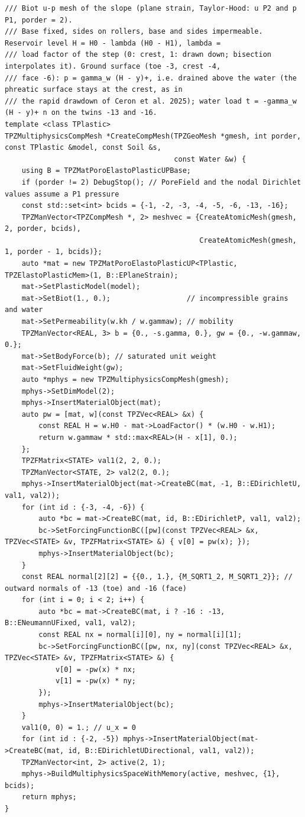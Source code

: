 \documentclass[11pt,a4paper]{article}
\newcommand{\cc}[1]{\texttt{\detokenize{#1}}} %
\begin{document}
\begin{lstlisting}[caption={Elementos gêmeos, malhas atômicas e malha multifísica u--p (\cc{Projects/SlopeDrawdown/main.cpp}).},label=lst:up]
/// Biot u-p mesh of the slope (plane strain, Taylor-Hood: u P2 and p P1, porder = 2).
/// Base fixed, sides on rollers, base and sides impermeable. Reservoir level H = H0 - lambda (H0 - H1), lambda =
/// load factor of the step (0: crest, 1: drawn down; bisection interpolates it). Ground surface (toe -3, crest -4,
/// face -6): p = gamma_w (H - y)+, i.e. drained above the water (the phreatic surface stays at the crest, as in
/// the rapid drawdown of Ceron et al. 2025); water load t = -gamma_w (H - y)+ n on the twins -13 and -16.
template <class TPlastic>
TPZMultiphysicsCompMesh *CreateCompMesh(TPZGeoMesh *gmesh, int porder, const TPlastic &model, const Soil &s,
                                        const Water &w) {
    using B = TPZMatPoroElastoPlasticUPBase;
    if (porder != 2) DebugStop(); // PoreField and the nodal Dirichlet values assume a P1 pressure
    const std::set<int> bcids = {-1, -2, -3, -4, -5, -6, -13, -16};
    TPZManVector<TPZCompMesh *, 2> meshvec = {CreateAtomicMesh(gmesh, 2, porder, bcids),
                                              CreateAtomicMesh(gmesh, 1, porder - 1, bcids)};
    auto *mat = new TPZMatPoroElastoPlasticUP<TPlastic, TPZElastoPlasticMem>(1, B::EPlaneStrain);
    mat->SetPlasticModel(model);
    mat->SetBiot(1., 0.);                  // incompressible grains and water
    mat->SetPermeability(w.kh / w.gammaw); // mobility
    TPZManVector<REAL, 3> b = {0., -s.gamma, 0.}, gw = {0., -w.gammaw, 0.};
    mat->SetBodyForce(b); // saturated unit weight
    mat->SetFluidWeight(gw);
    auto *mphys = new TPZMultiphysicsCompMesh(gmesh);
    mphys->SetDimModel(2);
    mphys->InsertMaterialObject(mat);
    auto pw = [mat, w](const TPZVec<REAL> &x) {
        const REAL H = w.H0 - mat->LoadFactor() * (w.H0 - w.H1);
        return w.gammaw * std::max<REAL>(H - x[1], 0.);
    };
    TPZFMatrix<STATE> val1(2, 2, 0.);
    TPZManVector<STATE, 2> val2(2, 0.);
    mphys->InsertMaterialObject(mat->CreateBC(mat, -1, B::EDirichletU, val1, val2));
    for (int id : {-3, -4, -6}) {
        auto *bc = mat->CreateBC(mat, id, B::EDirichletP, val1, val2);
        bc->SetForcingFunctionBC([pw](const TPZVec<REAL> &x, TPZVec<STATE> &v, TPZFMatrix<STATE> &) { v[0] = pw(x); });
        mphys->InsertMaterialObject(bc);
    }
    const REAL normal[2][2] = {{0., 1.}, {M_SQRT1_2, M_SQRT1_2}}; // outward normals of -13 (toe) and -16 (face)
    for (int i = 0; i < 2; i++) {
        auto *bc = mat->CreateBC(mat, i ? -16 : -13, B::ENeumannUFixed, val1, val2);
        const REAL nx = normal[i][0], ny = normal[i][1];
        bc->SetForcingFunctionBC([pw, nx, ny](const TPZVec<REAL> &x, TPZVec<STATE> &v, TPZFMatrix<STATE> &) {
            v[0] = -pw(x) * nx;
            v[1] = -pw(x) * ny;
        });
        mphys->InsertMaterialObject(bc);
    }
    val1(0, 0) = 1.; // u_x = 0
    for (int id : {-2, -5}) mphys->InsertMaterialObject(mat->CreateBC(mat, id, B::EDirichletUDirectional, val1, val2));
    TPZManVector<int, 2> active(2, 1);
    mphys->BuildMultiphysicsSpaceWithMemory(active, meshvec, {1}, bcids);
    return mphys;
}
\end{lstlisting}
\end{document}
